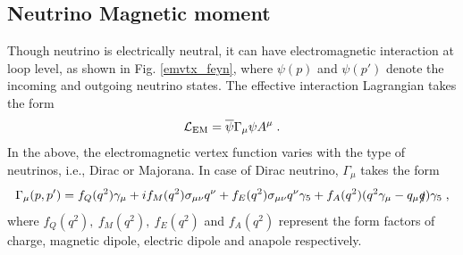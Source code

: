 \documentclass[aps, a4paper,superscriptaddress,12pt,preprintnumbers,floatfix,nofootinbib,amsmath,amssymb]{revtex4}
\begin{document}
\subsection{Neutrino Magnetic moment}
Though neutrino is electrically neutral, it can have electromagnetic interaction at loop level, as shown in Fig. \ref{emvtx_feyn}, where $\psi(p)$ and $\psi(p')$ denote the incoming and outgoing neutrino states. The effective interaction Lagrangian takes the form \cite{Xing:2011zza}
\begin{equation}
\mathcal{L}_{\rm EM} =  \overline{\psi}\Gamma_\mu \psi A^\mu\;.
\end{equation}
In the above, the electromagnetic vertex function varies with the type of neutrinos, i.e., Dirac or Majorana. In case of Dirac neutrino, $\Gamma_\mu$ takes the form
\begin{equation}
\Gamma_\mu (p,p^\prime) =  f_Q(q^2)\gamma_\mu + if_M(q^2)\sigma_{\mu\nu}q^\nu + f_E(q^2) \sigma_{\mu\nu}q^\nu \gamma_5 + f_A(q^2) (q^2\gamma_\mu - q_\mu\slashed{q})\gamma_5\;,
\end{equation}
where $f_Q(q^2),~f_M(q^2),~ f_E(q^2)$ and $f_A(q^2)$ represent the form factors of charge, magnetic dipole, electric dipole and anapole respectively.
% 
%
\end{document}

